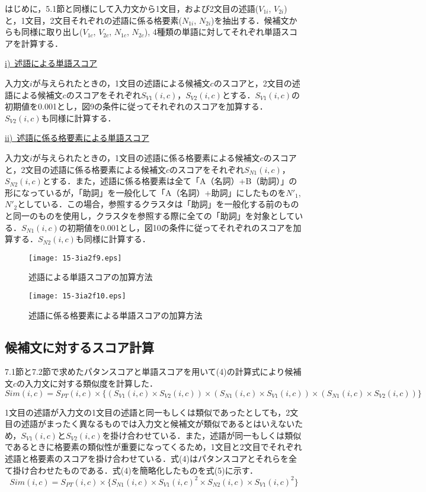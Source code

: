 \documentclass[japanese]{jnlp_1.4}
\begin{document}
はじめに，5.1節と同様にして入力文から1文目，および2文目の述語($V_{1i}$, $V_{2i}$)と，1文目，2文目それぞれの述語に係る格要素($N_{1i}$, $N_{2i}$)を抽出する．候補文からも同様に取り出し($V_{1c}$, $V_{2c}$, $N_{1c}$, $N_{2c}$), 4種類の単語に対してそれぞれ単語スコアを計算する．

\noindent
\ul{\mbox{i) 述語による単語スコア}}

入力文$i$が与えられたときの，1文目の述語による候補文$c$のスコアと，2文目の述語による候補文$c$のスコアをそれぞれ$S_{V1}(i,c)$，$S_{V2}(i,c)$とする．$S_{V1}(i,c)$の初期値を0.001とし，図9の条件に従ってそれぞれのスコアを加算する．$S_{V2}(i,c)$も同様に計算する．

\noindent
\ul{\mbox{ii) 述語に係る格要素による単語スコア}}

入力文$i$が与えられたときの，1文目の述語に係る格要素による候補文$c$のスコアと，2文目の述語に係る格要素による候補文$c$のスコアをそれぞれ$S_{N1}(i,c)$，$S_{N2}(i,c)$とする．また，述語に係る格要素は全て「A（名詞）+B（助詞）」の形になっているが，「助詞」を一般化して「A（名詞）+助詞」にしたものを$N'_{1}$, $N'_{2}$としている．この場合，参照するクラスタは「助詞」を一般化する前のものと同一のものを使用し，クラスタを参照する際に全ての「助詞」を対象としている．$S_{N1}(i,c)$の初期値を0.001とし，図10の条件に従ってそれぞれのスコアを加算する．$S_{N2}(i,c)$も同様に計算する．


\begin{figure}[b]
\centerline{\texttt{[image: 15-3ia2f9.eps]}}
\caption{述語による単語スコアの加算方法}
\end{figure}
\begin{figure}[b]
\centerline{\texttt{[image: 15-3ia2f10.eps]}}
\caption{述語に係る格要素による単語スコアの加算方法}
\end{figure}


\subsection{候補文に対するスコア計算}

7.1節と7.2節で求めたパタンスコアと単語スコアを用いて(4)の計算式により候補文$c$の入力文に対する類似度を計算した．
\begin{equation}
 \mathit{Sim}(i,c) = S_{PT}(i,c) \times \{(S_{V1}(i,c)\times S_{V2}(i,c)) \times (S_{N1}(i,c)\times S_{V1}(i,c)) \times (S_{N1}(i,c)\times S_{V2}(i,c))\}
\end{equation}

1文目の述語が入力文の1文目の述語と同一もしくは類似であったとしても，2文目の述語がまったく異なるものでは入力文と候補文が類似であるとはいえないため，$S_{V1}(i,c)$と$S_{V2}(i,c)$を掛け合わせている．また，述語が同一もしくは類似であるときに格要素の類似性が重要になってくるため，1文目と2文目でそれぞれ述語と格要素のスコアを掛け合わせている．式(4)はパタンスコアとそれらを全て掛け合わせたものである．式(4)を簡略化したものを式(5)に示す．
\begin{equation}
 \mathit{Sim}(i,c) = S_{PT}(i,c) \times \{S_{N1}(i,c)\times S_{V1}(i,c)^{2} \times S_{N2}(i,c)\times S_{V1}(i,c)^{2}\}
\end{equation}
\end{document}

